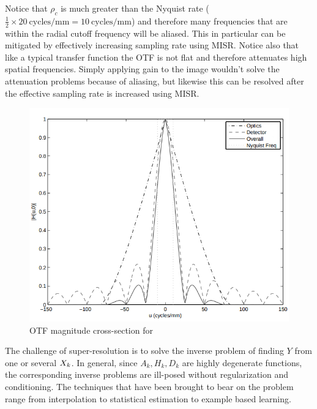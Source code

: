 %
Notice that $\rho_c$ is much greater than the Nyquist rate ($\frac{1}{2} \times 20~\text{cycles}/\text{mm} = 10~\text{cycles}/\text{mm}$) and therefore many frequencies that are within the radial cutoff frequency will be aliased.
%
This in particular can be mitigated by effectively increasing sampling rate using MISR.
%
Notice also that like a typical transfer function the OTF is not flat and therefore attenuates high spatial frequencies.
%
Simply applying gain to the image wouldn't solve the attenuation problems because of aliasing, but likewise this can be resolved after the effective sampling rate is increased using MISR.
\begin{figure}
    \includegraphics[width=\linewidth,keepaspectratio]{figures/mtf.png}
    \caption{OTF magnitude cross-section for\cite{milanfar2017super}}
    \label{fig:mtf}
\end{figure}

The challenge of super-resolution is to solve the inverse problem of finding $Y$ from one or several $X_k$.
%
In general, since $A_k, H_k, D_k$ are highly degenerate functions, the corresponding inverse problems are ill-posed without regularization and conditioning.
%
The techniques that have been brought to bear on the problem range from interpolation to statistical estimation to example based learning.
